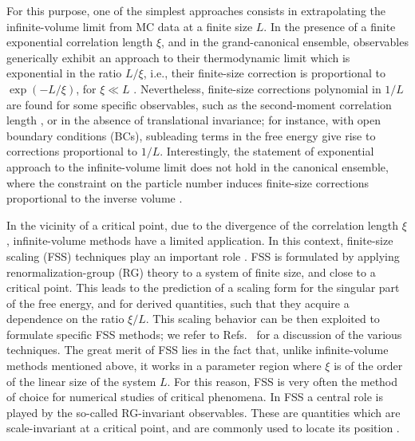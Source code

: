\documentclass[pre,twocolumn]{revtex4-2}
\begin{document}
For this purpose, one of the simplest approaches consists in extrapolating the infinite-volume limit from MC data at a finite size $L$.
In the presence of a finite exponential correlation length $\xi$, and in the grand-canonical ensemble, observables generically exhibit an approach to their thermodynamic limit which is exponential in the ratio $L/\xi$,
i.e., their finite-size correction is proportional to $\exp(-L/\xi)$, for $\xi\ll L$ \cite{Luescher-86,Neuberger-89,Muenster-85}.
Nevertheless, finite-size corrections polynomial in $1/L$ are found for some specific observables, such as the second-moment correlation length \cite{CP-98,PTHAH-14}, or in the absence of translational invariance; for instance, with open boundary conditions (BCs), subleading terms in the free energy give rise to corrections proportional to $1/L$.
Interestingly, the statement of exponential approach to the infinite-volume limit does not hold in the canonical ensemble, where the constraint on the particle number induces finite-size corrections proportional to the inverse volume \cite{WAPT-17}.

In the vicinity of a critical point, due to the divergence of the correlation length $\xi$, infinite-volume methods have a limited application.
In this context, finite-size scaling (FSS) techniques play an important role \cite{Privman-90,PV-02}.
FSS is formulated by applying renormalization-group (RG) theory
to a system of finite size, and close to a critical point.
This leads to the prediction of a scaling form for the singular part of the free energy, and for derived quantities, such that they acquire a dependence on the ratio $\xi/L$.
This scaling behavior can be then exploited to formulate specific FSS methods; we refer to Refs.~\cite{Privman-90,PV-02} for a discussion of the various techniques.
The great merit of FSS lies in the fact that,
unlike infinite-volume methods mentioned above, it works in a parameter region where $\xi$ is of the order of the linear size of the system $L$.
For this reason, FSS is very often the method of choice for numerical studies of critical phenomena.
In FSS a central role is played by the so-called RG-invariant observables.
These are quantities which are scale-invariant at a critical point, and are commonly used to locate its position \cite{Privman-90,PV-02}.
\end{document}
